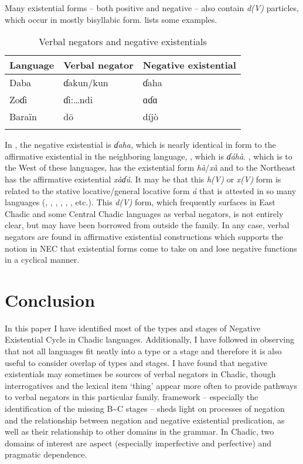 \documentclass[output=paper,draft,draftmode,colorlinks,citecolor=brown]{langscibook}
\begin{document}
Many existential forms -- both positive and negative -- also contain \textit{d(V)} particles, which occur in mostly bisyllabic form.  lists some examples.

\begin{table}
\begin{tabularx}{\textwidth}{XXl}
\lsptoprule

Language		& Verbal negator 			& Negative existential\\\midrule
Daba 			&ɗakun/kun 				& ɗaha\\
Zoɗi 			&ɗi:\ldots ndi 			&ɑɗɑ\\
Baraïn 			&d\=o					&díj\`o\\
\lspbottomrule
\end{tabularx}
\caption{Verbal negators and negative existentials}
\label{tab:3:4}
\end{table}

In , the negative existential is \textit{ɗaha,} which is nearly identical in form to the affirmative existential in the neighboring language, , which is \textit{ɗáhà}. , which is to the West of these languages, has the existential form \textit{hà}/\textit{xà} and  to the Northeast has the affirmative existential \textit{xàɗ\'u}. It may be that this \textit{h(V)} or \textit{x(V)} form is related to the stative locative/general locative form \textit{á} that is attested in so many languages (, , , , , , etc.). This \textit{d(V)} form, which frequently surfaces in East Chadic and some Central Chadic languages as verbal negators, is not entirely clear, but may have been borrowed from outside the family. In any case, verbal negators are found in affirmative existential constructions which supports the notion in NEC that existential forms come to take on and lose negative functions in a cyclical manner.
\section{Conclusion}\label{sec:3:7}

In this paper I have identified most of the types and stages of
 Negative Existential Cycle in Chadic languages.
Additionally, I have followed \citet{Veselinova2016} in observing that not
all languages fit neatly into a type or a stage and therefore it is also
useful to consider overlap of types and stages. I have found that negative
existentials may sometimes be sources of verbal negators in Chadic, though
interrogatives and the lexical item `thing' appear more often to provide
pathways to verbal negators in this particular family.
 framework -- especially the identification of the missing
B{\textasciitilde}C stages -- sheds light on processes of negation and the
relationship between negation and negative existential predication, as well
as their relationship to other domains in the grammar. In Chadic, two
domains of interest are aspect (especially imperfective and perfective) and
pragmatic dependence.
\end{document}
